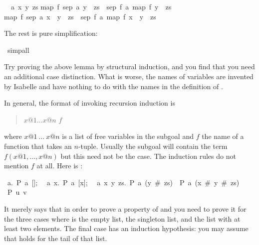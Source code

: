 \begin{isabellebody}
\begin{isamarkuptxt}
\begin{isabelle}
\ {}{\isachardot}\ {\isasymAnd}a\ x\ y\ zs{\isachardot}\isanewline
{}map\ f\ {\isacharparenleft}sep\ {\isacharparenleft}a{\isacharcomma}\ y\ {\isacharhash}\ zs{\isacharparenright}{\isacharparenright}\ {\isacharequal}\ sep\ {\isacharparenleft}f\ a{\isacharcomma}\ map\ f\ {\isacharparenleft}y\ {\isacharhash}\ zs{\isacharparenright}{\isacharparenright}\ {\isasymLongrightarrow}\isanewline
{}map\ f\ {\isacharparenleft}sep\ {\isacharparenleft}a{\isacharcomma}\ x\ {\isacharhash}\ y\ {\isacharhash}\ zs{\isacharparenright}{\isacharparenright}\ {\isacharequal}\ sep\ {\isacharparenleft}f\ a{\isacharcomma}\ map\ f\ {\isacharparenleft}x\ {\isacharhash}\ y\ {\isacharhash}\ zs{\isacharparenright}{\isacharparenright}%
\end{isabelle}
The rest is pure simplification:%
\end{isamarkuptxt}%
\isamarkuptrue%
\ simp{\isacharunderscore}all\isanewline
\isamarkupfalse%
\isamarkupfalse%
%
\begin{isamarkuptext}%
Try proving the above lemma by structural induction, and you find that you
need an additional case distinction. What is worse, the names of variables
are invented by Isabelle and have nothing to do with the names in the
definition of .

In general, the format of invoking recursion induction is
\begin{quote}
 $x@1 \dots x@n$  $f$
\end{quote}%
where $x@1~\dots~x@n$ is a list of free variables in the subgoal and $f$ the
name of a function that takes an $n$-tuple. Usually the subgoal will
contain the term $f(x@1,\dots,x@n)$ but this need not be the case. The
induction rules do not mention $f$ at all. Here is :
\begin{isabelle}
{\isasymlbrakk}~{\isasymAnd}a.~P~a~[];\isanewline
~~{\isasymAnd}a~x.~P~a~[x];\isanewline
~~{\isasymAnd}a~x~y~zs.~P~a~(y~\#~zs)~{\isasymLongrightarrow}~P~a~(x~\#~y~\#~zs){\isasymrbrakk}\isanewline
{\isasymLongrightarrow}~P~u~v%
\end{isabelle}
It merely says that in order to prove a property  of  and
 you need to prove it for the three cases where  is the
empty list, the singleton list, and the list with at least two elements.
The final case has an induction hypothesis:  you may assume that 
holds for the tail of that list.%
\end{isamarkuptext}%
\isamarkuptrue%
\isanewline
\isamarkupfalse%
\end{isabellebody}%
